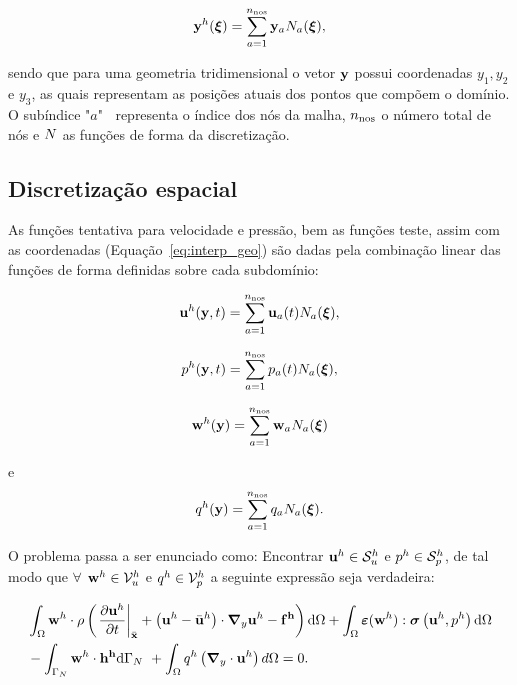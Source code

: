 \begin{align}
	\mathbf{y}^{h}(\bm{\xi}) = \sum_{a = 1}^{n_{\mathrm{nos}}} \mathbf{y}_{a}N_{a}(\boldsymbol{\xi}),  \label{eq:interp_geo}
\end{align}

\noindent sendo que para uma geometria tridimensional o vetor $\mathbf{y}$ possui coordenadas $y_1,y_2$ e $y_3$, as quais representam as posições atuais dos pontos que compõem o domínio. O subíndice "$a$" $ \ $ representa o índice dos nós da malha, $n_{\mathrm{nos}}$ o número total de nós e $N$ as funções de forma da discretização.


\subsection{Discretização espacial} \label{capitulo:Cap2:DiscEspacial}

As funções tentativa para velocidade e pressão, bem as funções teste, assim com as coordenadas (Equação~\eqref{eq:interp_geo}) são dadas pela combinação linear das funções de forma definidas sobre cada subdomínio:

\begin{align}
	\mathbf{u}^h(\mathbf{y},t) = \sum_{a = 1}^{n_{\mathrm{nos}}} \mathbf{u}_{a}(t)N_{a}(\boldsymbol{\xi}), \label{eq:interp_vel}
\end{align}

\begin{align}
	p^h(\mathbf{y},t)  = \sum_{a = 1}^{n_{\mathrm{nos}}} p_{a}(t)N_{a}(\boldsymbol{\xi}),\label{eq:interp_press} 
\end{align}

\begin{align}
	\mathbf{w}^h(\mathbf{y})  = \sum_{a = 1}^{n_{\mathrm{nos}}} \mathbf{w}_{a}N_{a}(\boldsymbol{\xi}) \label{eq:interp_utest}
\end{align}

\noindent e
\begin{align}
	q^h(\mathbf{y})  = \sum_{a = 1}^{n_{\mathrm{nos}}} q_{a}N_{a}(\boldsymbol{\xi}). \label{eq:inter_ptest} 
\end{align}

O problema passa a ser enunciado como: Encontrar $\mathbf{u}^h \in \mathcal{S}_u^h$ e $p^h \in \mathcal{S}_p^h$, de tal modo que $\forall$ $\mathbf{w}^h \in \mathcal{V}_u^h$ e $q^h \in \mathcal{V}_p^h$ a seguinte expressão seja verdadeira:

\begin{align}
	\begin{split}
		&\int_{\Omega} \mathbf{w}^h \cdot \rho \left(\left. \frac{\partial\mathbf{u}^h}{\partial t} \right|_{\bar{\mathbf{x}}} + \left(\mathbf{u}^h - \bar{\mathbf{u}}^h \right)\cdot\boldsymbol{\nabla}_y \mathbf{u}^h - \mathbf{f^h} \right) \mathrm{d} \Omega + \int_{\Omega} \bm{\varepsilon}(\mathbf{w}^h) : \boldsymbol{\sigma}\left(\mathbf{u}^h,p^h \right)  \mathrm{d} \Omega\\ & - \int_{\Gamma_{N}} \mathbf{w}^h \cdot \mathbf{h^h} \mathrm{d} \Gamma_{N} \ + \int_{\Omega} q^h \left(\boldsymbol{\nabla}_y \cdot \mathbf{u}^h\right) d \Omega = 0.  \label{eq:QM_C_forma_fraca_1} 
	\end{split}
\end{align}

